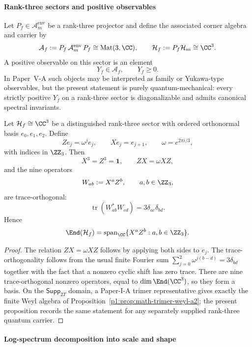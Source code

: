 \documentclass[12pt,a4paper]{article}
\begin{document}
\paragraph{Rank-three sectors and positive observables}
\label{p4:sec:part2-threelevel-sector}

Let $P_f\in\mathcal A_m^{\mathrm{env}}$ be a rank-three projector and define the associated corner algebra and carrier by
\[
\mathcal A_f:=P_f\,\mathcal A_m^{\mathrm{env}}\,P_f\cong \mathrm{Mat}(3,\CC),
\qquad
\mathcal H_f:=P_f\mathcal H_m\cong \CC^3.
\]
A positive observable on this sector is an element
\[
Y_f\in\mathcal A_f,
\qquad
Y_f\ge 0.
\]
In Paper~V-A such objects may be interpreted as family or Yukawa-type observables, but the present statement is purely quantum-mechanical: every strictly positive $Y_f$ on a rank-three sector is diagonalizable and admits canonical spectral invariants.


\begin{proposition}
\label{p4:prop:rank-three-weyl-basis}
Let \(\mathcal H_f\cong\CC^3\) be a distinguished rank-three sector with ordered orthonormal basis \(e_0,e_1,e_2\).
Define
\[
Z e_j=\omega^j e_j,
\qquad
X e_j=e_{j+1},
\qquad
\omega=e^{2\pi i/3},
\]
with indices in \(\ZZ_3\).
Then
\[
X^3=Z^3=\mathbf 1,
\qquad
ZX=\omega XZ,
\]
and the nine operators
\[
W_{ab}:=X^aZ^b,
\qquad a,b\in\ZZ_3,
\]
are trace-orthogonal:
\[
\operatorname{tr}(W_{ab}^*W_{cd})=3\delta_{ac}\delta_{bd}.
\]
Hence
\[
\End(\mathcal H_f)=\operatorname{span}_{\CC}\{X^aZ^b:a,b\in\ZZ_3\}.
\]
\end{proposition}


\begin{proof}
The relation \(ZX=\omega XZ\) follows by applying both sides to \(e_j\).
The trace-orthogonality follows from the usual finite Fourier sum \(\sum_{j=0}^{2}\omega^{j(b-d)}=3\delta_{bd}\) together with the fact that a nonzero cyclic shift has zero trace.
There are nine trace-orthogonal nonzero operators, equal to \(\dim\End(\CC^3)\), so they form a basis.
On the \(\mathsf{Supp}_{2T}\) domain, a Paper-I-A trimer representative gives
exactly the finite Weyl algebra of
Proposition~\ref{p1:prop:math-trimer-weyl-a2}; the present proposition records
the same statement for any separately supplied rank-three quantum carrier.
\end{proof}



\paragraph{Log-spectrum decomposition into scale and shape}
\label{p4:sec:part2-threelevel-logshape}
\end{document}
